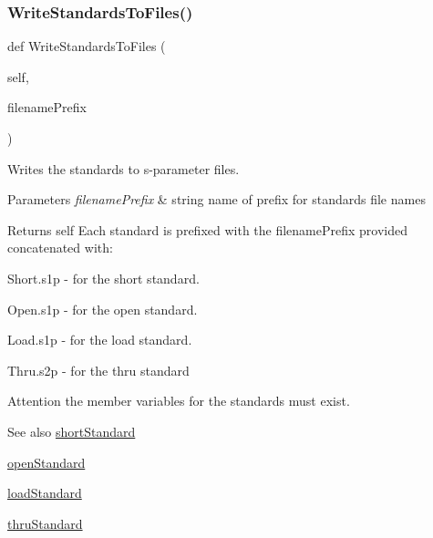 \subsubsection{\texorpdfstring{Write\+Standards\+To\+Files()}{WriteStandardsToFiles()}}
{\footnotesize\ttfamily def Write\+Standards\+To\+Files (\begin{DoxyParamCaption}\item[{}]{self,  }\item[{}]{filename\+Prefix }\end{DoxyParamCaption})}



Writes the standards to s-\/parameter files. 


\begin{DoxyParams}{Parameters}
{\em filename\+Prefix} & string name of prefix for standards file names \\
\hline
\end{DoxyParams}
\begin{DoxyReturn}{Returns}
self Each standard is prefixed with the filename\+Prefix provided concatenated with\+:
\begin{DoxyItemize}
\item \textquotesingle{}Short.\+s1p\textquotesingle{} -\/ for the short standard.
\item \textquotesingle{}Open.\+s1p\textquotesingle{} -\/ for the open standard.
\item \textquotesingle{}Load.\+s1p\textquotesingle{} -\/ for the load standard.
\item \textquotesingle{}Thru.\+s2p\textquotesingle{} -\/ for the thru standard 
\end{DoxyItemize}
\end{DoxyReturn}
\begin{DoxyAttention}{Attention}
the member variables for the standards must exist. 
\end{DoxyAttention}
\begin{DoxySeeAlso}{See also}
\hyperlink{classSignalIntegrity_1_1Measurement_1_1CalKit_1_1CalibrationKit_1_1CalibrationKit_a094c01f8f3b9b22b8759481b3d5bdb85}{short\+Standard} 

\hyperlink{classSignalIntegrity_1_1Measurement_1_1CalKit_1_1CalibrationKit_1_1CalibrationKit_adfa88578140d393e4fc3d5e6976c4586}{open\+Standard} 

\hyperlink{classSignalIntegrity_1_1Measurement_1_1CalKit_1_1CalibrationKit_1_1CalibrationKit_af4b585ef48fed700d70b2bee7e5ffdbe}{load\+Standard} 

\hyperlink{classSignalIntegrity_1_1Measurement_1_1CalKit_1_1CalibrationKit_1_1CalibrationKit_a63691e31dc0a91dbcfe40635f9c87599}{thru\+Standard} 
\end{DoxySeeAlso}


